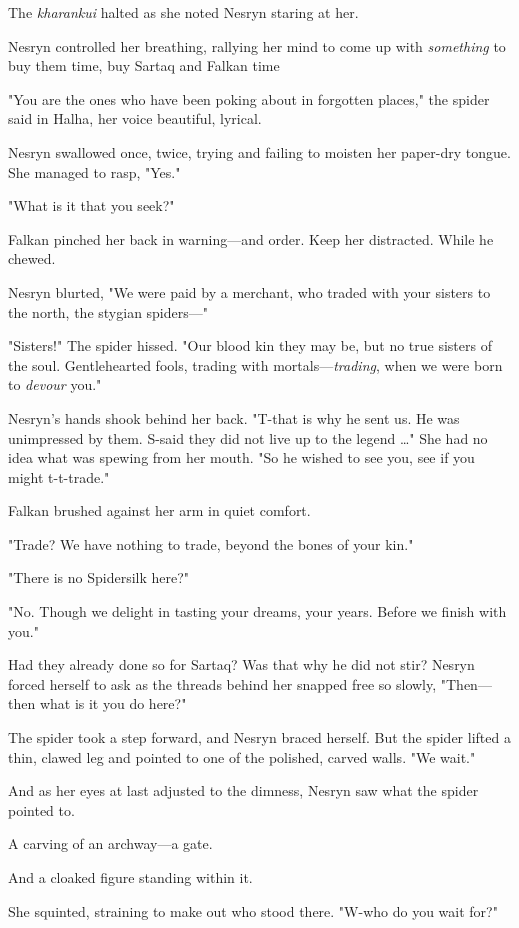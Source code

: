The \emph{kharankui} halted as she noted Nesryn staring at her.

Nesryn controlled her breathing, rallying her mind to come up with \emph{something} to buy them time, buy Sartaq and Falkan time 

"You are the ones who have been poking about in forgotten places," the spider said in Halha, her voice beautiful, lyrical.

Nesryn swallowed once, twice, trying and failing to moisten her paper-dry tongue.
She managed to rasp, "Yes."

"What is it that you seek?"

Falkan pinched her back in warning---and order.
Keep her distracted.
While he chewed.

Nesryn blurted, "We were paid by a merchant, who traded with your sisters to the north, the stygian spiders---"

"Sisters!"
The spider hissed.
"Our blood kin they may be, but no true sisters of the soul.
Gentlehearted fools, trading with mortals---\emph{trading}, when we were born to \emph{devour} you."

Nesryn's hands shook behind her back.
"T-that is why he sent us.
He was unimpressed by them.
S-said they did not live up to the legend \ldots" She had no idea what was spewing from her mouth.
"So he wished to see you, see if you might t-t-trade."

Falkan brushed against her arm in quiet comfort.

"Trade?
We have nothing to trade, beyond the bones of your kin."

"There is no Spidersilk here?"

"No.
Though we delight in tasting your dreams, your years.
Before we finish with you."

Had they already done so for Sartaq?
Was that why he did not stir?
Nesryn forced herself to ask as the threads behind her snapped free so slowly, "Then--- then what is it you do here?"

The spider took a step forward, and Nesryn braced herself.
But the spider lifted a thin, clawed leg and pointed to one of the polished, carved walls.
"We wait."

And as her eyes at last adjusted to the dimness, Nesryn saw what the spider pointed to.

A carving of an archway---a gate.

And a cloaked figure standing within it.

She squinted, straining to make out who stood there.
"W-who do you wait for?"

